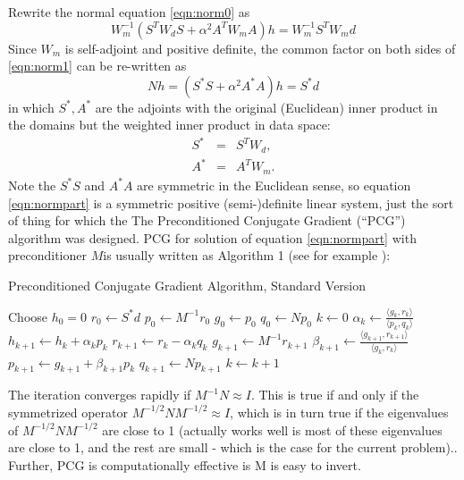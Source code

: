 Rewrite the normal equation \ref{eqn:norm0} as
\begin{equation}
  \label{eqn:norm1}
  W_m^{-1}(S^TW_dS + \alpha^2 A^TW_mA)h = W_m^{-1}S^TW_md 
\end{equation}
Since $W_m$ is self-adjoint and positive definite, the common factor on both sides of \ref{eqn:norm1} can be re-written as
\begin{equation}
  \label{eqn:normpart}
  Nh = (S^*S + \alpha^2 A^*A)h = S^*d 
\end{equation}
in which $S^*, A^*$ are the adjoints with the original (Euclidean)
inner product in the domains but the weighted inner product in data
space:
\begin{eqnarray}
  \label{eqn:sadj}
  S^* &=& S^T W_d,\\
  A^* &=& A^T W_m.
\end{eqnarray}
Note the $S^*S$ and $A^*A$ are symmetric in the Euclidean sense, so
equation \ref{eqn:normpart} is a symmetric positive (semi-)definite
linear system, just the sort of thing for which the 
The Preconditioned Conjugate Gradient (``PCG'') algorithm was
designed. PCG for solution
of equation \ref{eqn:normpart} with preconditioner $M$is usually
written as Algorithm 1 (see for example \cite{Golub:2012}):

\begin{algorithm}[H]
\caption{Preconditioned Conjugate Gradient Algorithm, Standard Version}
\begin{algorithmic}[1]
\State Choose $h_0=0$ 
  \State $r_0 \gets S^*d$
  \State $p_0 \gets M^{-1} r_0$
  \State $g_0 \gets p_0$
  \State $q_0 \gets Np_0$
  \State $k \gets 0$
  \Repeat
  \State $\alpha_k \gets \frac{\langle g_k,r_k \rangle}{\langle p_k,q_k\rangle}$
  \State $h_{k+1} \gets h_k + \alpha_k p_k$
  \State $r_{k+1} \gets r_k - \alpha_kq_k$
  \State $g_{k+1} \gets M^{-1} r_{k+1}$
  \State $\beta_{k+1} \gets \frac{\langle g_{k+1},r_{k+1}\rangle}{\langle g_k,r_k\rangle}$
  \State $p_{k+1}\gets g_{k+1}+\beta_{k+1}p_k$
  \State $q_{k+1} \gets Np_{k+1}$
  \State $k \gets k+1$
\end{algorithmic}
\end{algorithm}
The iteration converges rapidly if $M^{-1}N \approx I$. This is true
if and only if the symmetrized operator $M^{-1/2}NM^{-1/2} \approx I$,
which is in turn true if the eigenvalues of $M^{-1/2}NM^{-1/2}$ are
close to 1 (actually works well is most of these eigenvalues are close
to 1, and the rest are small - which is the case for the current
problem)..  Further, PCG is computationally effective is M is easy to
invert.

